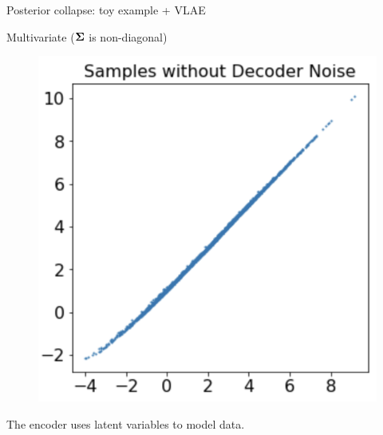 \documentclass{beamer}
\begin{document}
\begin{frame}{Posterior collapse: toy example + VLAE}
\begin{block}{Multivariate ($\boldsymbol{\Sigma}$ is non-diagonal)}
\begin{minipage}[t]{0.33\columnwidth}
\begin{figure}[h]
			\end{figure}
		\end{minipage}%
		\begin{minipage}[t]{0.33\columnwidth}
			\begin{figure}[h]
				\centering
				\includegraphics[width=.75\linewidth]{figs/posterior_collapse_toy_5.png}
			\end{figure}
		\end{minipage}
		The encoder uses latent variables to model data.
	\end{block}
	

\end{frame}
\end{document}
